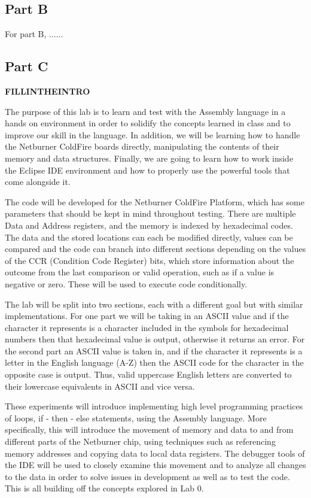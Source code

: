 \documentclass[letterpaper]{article}
\begin{document}
  \subsection{Part B}
  For part B, ......
  \subsection{Part C}
  \textbf{FILLINTHEINTRO}

  The purpose of this lab is to learn and test with the Assembly language in a hands on environment
  in order to solidify the concepts learned in class and to improve our skill in the language.  In
  addition, we will be learning how to handle the Netburner ColdFire boards directly, manipulating
  the contents of their memory and data structures.  Finally, we are going to learn how to work inside
  the Eclipse IDE environment and how to properly use the powerful tools that come alongside it.



  The code will be developed for the Netburner ColdFire Platform, which has some parameters that should
  be kept in mind throughout testing.  There are multiple Data and Address registers, and the memory
  is indexed by hexadecimal codes.  The data and the stored locations can each be modified directly, values
  can be compared and the code can branch into different sections depending on the values of the CCR
  (Condition Code Register) bits,
  which store information about the outcome from the last comparison or valid operation, such as if a
  value is negative or zero.  These will be used to execute code conditionally.

  The lab will be split into two sections, each with a different goal but with similar implementations.
  For one part we will be taking in an ASCII value and if the character it represents is a character
  included in the symbols for hexadecimal numbers then that hexadecimal value is output, otherwise
  it returns an error.  For the second part an ASCII value is taken in, and if the character it represents
  is a letter in the English language (A-Z) then the ASCII code for the character in the opposite case
  is output.  Thus, valid uppercase English letters are converted to their lowercase equivalents in ASCII
  and vice versa.


  These experiments will introduce implementing high level programming practices of loops, if - then - else statements,
  using the Assembly language. More specifically, this will introduce the movement of
  memory and data to and from different parts of the Netburner chip, using techniques such as referencing
  memory addresses and copying data to local data registers.  The debugger tools of the IDE will be used
  to closely examine this movement and to analyze all changes to the data in order to solve issues in
  development as well as to test the code.  This is all building off the concepts explored in Lab 0.
\end{document}
